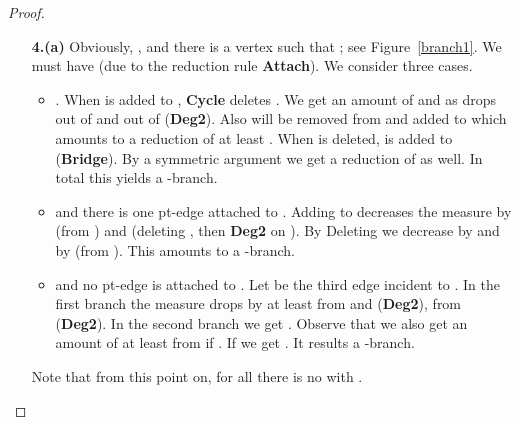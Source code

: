 \documentclass{llncs}
\begin{document}
{{\begin{proof}
\begin{enumerate}\itemsep.5pt
 \item[\bf 4.(a)] Obviously, , and there is a vertex  such that ; see Figure~\ref{branch1}. We must have  (due to the reduction rule {\bf Attach}).
We consider three cases.
\begin{itemize}
\item . When  is added to , {\bf Cycle} deletes . We get an amount of  and  as  drops out of  and  out of  ({\bf Deg2}). Also  will be removed from  and added to  which amounts to a reduction of at least . When  is deleted,  is added to  ({\bf Bridge}). By a symmetric argument we get a reduction of  as well. In total this yields a -branch.
\item  and there is one  pt-edge attached to . Adding  to  decreases the measure by  (from ) and  (deleting , then {\bf Deg2} on ). By Deleting   we decrease  by  and by  (from ).   This amounts to a -branch.
\item  and no pt-edge is attached to . Let  be the third edge incident to . In the first branch the measure drops by at least  from  and  ({\bf Deg2}),  from  ({\bf Deg2}). 
In the second branch we get . Observe that we also get an amount of at least  from  if . If  we get .  It results a -branch.
\end{itemize}
Note that from this point on, for all  there is no  with .\vspace*{2ex}


\end{enumerate}
\end{proof}}}
\end{document}
